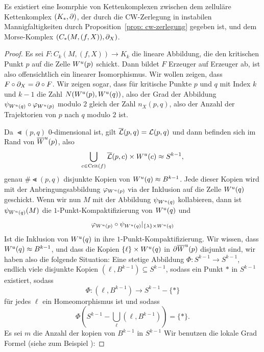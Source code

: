 \begin{theorem}
    \label{satz: morse-homologie ist zellulaere homologie}
    Es existiert eine Isomrphie von Kettenkomplexen zwischen dem zelluläre Kettenkomplex 
    $(K_{\ast}, { \partial })$, der durch die CW-Zerlegung in instabilen Mannigfaltigkeiten durch 
    Proposition~\ref{prop: cw-zerlegung} gegeben ist, und dem Morse-Komplex 
    $(C_{\ast}(M, (f, X)), { \partial }_X)$.
\end{theorem}

\begin{proof}
    Es sei $F \colon C_k (M, (f, X)) \to K_k$ die lineare Abbildung, die den kritischen Punkt $p$
    auf die Zelle ${ W^u } (p)$ schickt. Dann bildet $F$ Erzeuger auf Erzeuger ab, ist also 
    offensichtlich ein linearer Isomorphismus. Wir wollen zeigen, dass 
    $F \circ { \partial }_X = { \partial } \circ F$. Wir zeigen sogar, dass für kritische Punkte $p$ und $q$ mit 
    Index $k$ und $k - 1$ die Zahl $N ({ W^u } (p), { W^u } (q))$, also der Grad der Abbildung 
    $\psi_{{ W^u } (q)} \circ \varphi_{{ W^u } (p)}$ modulo $2$ gleich der Zahl $n_X(p, q)$, also 
    der Anzahl der Trajektorien von $p$ nach $q$ modulo $2$ ist. 

    Da $\Lt (p, q)$ $0$-dimensional ist, gilt ${\overline{\mathcal{L}} } (p, q) = { \mathcal{L} } (p, q)$ und dann befinden sich im 
    Rand von ${ \overline{W}^u } (p)$, also 
    \[ \bigcup_{c \in { \operatorname{Crit} } (f)} {\overline{\mathcal{L}} } (p, c) \times { W^u } (c) \approx S^{k - 1} , \] 
    genau $\# \Lt (p, q)$ disjunkte Kopien von ${ W^u } (q) \approx B^{k - 1}$. Jede dieser Kopien 
    wird mit der Anbringungsabbildung $\varphi_{{ W^u } (p)}$ via der Inklusion auf die Zelle ${ W^u } (q)$
    geschickt. Wenn wir nun $M$ mit der Abbildung $\psi_{{ W^u } (q)}$ kollabieren, dann ist 
    $\psi_{{ W^u } (q)} (M)$ die $1$-Punkt-Kompaktifizierung von ${ W^u } (q)$ und 
    \[ \varphi_{{ W^u } (p)} \circ \psi_{{ W^u } (q)} |_{ \{ \lambda \} \times { W^u } (q) } \]
    Ist die Inklusion von ${ W^u } (q)$ in ihre $1$-Punkt-Kompaktifizierung. Wir wissen, dass 
    ${ W^u } (q) \approx B^{k - 1}$, und dass die Kopien $\{ \ell \} \times { W^u } (q)$ in 
    ${ \partial } { \overline{W}^u } (p)$ disjunkt sind, wir haben also die folgende Situation:
    Eine stetige Abbildung $\Phi \colon S^{k - 1} \to S^{k - 1}$, endlich viele disjunkte Kopien 
    $(\ell, B^{k - 1}) \subseteq S^{k - 1}$, sodass ein Punkt $\ast$ in $S^{k - 1}$ existiert, sodass
    \[ \Phi \colon (\ell, B^{k - 1}) \to S^{k - 1} - \{ \ast \} \]
    für jedes $\ell$ ein Homeomorphismus ist und sodass
    \[ \Phi \left( S^{k - 1} - \bigcup_{\ell} \left( \ell, B^{k - 1} \right) \right) = \{ \ast \} . \]
    Es sei $m$ die Anzahl der kopien von $B^{k - 1}$ in $S^{k - 1}$
    Wir benutzen die lokale Grad Formel (siehe zum Beispiel \cite{hatcher}): 
    

\end{proof}
